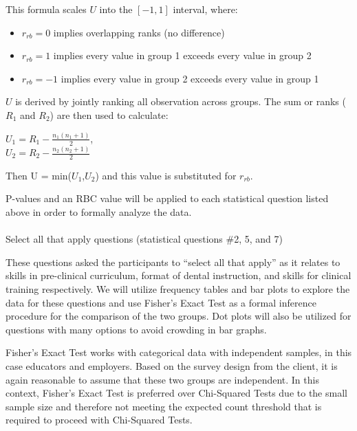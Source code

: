 \documentclass[
  12pt,
  letterpaper,
  DIV=11,
  numbers=noendperiod]{scrartcl}
\makeatletter
\let\oldparagraph\paragraph
\renewcommand{\paragraph}{
    \@ifstar
      \xxxParagraphStar
      \xxxParagraphNoStar
  }
\newcommand{\xxxParagraphStar}[1]{\oldparagraph*{#1}\mbox{}}
\newcommand{\xxxParagraphNoStar}[1]{\oldparagraph{#1}\mbox{}}
\providecommand{\tightlist}{%
  \setlength{\itemsep}{0pt}\setlength{\parskip}{0pt}}\usepackage{longtable,booktabs,array}
\numberwithin{figure}{section}
\numberwithin{table}{section}
\makeatother
\begin{document}
This formula scales \(U\) into the \([-1,1]\) interval, where:

\begin{itemize}
\tightlist
\item
  \(r_{rb} = 0\) implies overlapping ranks (no difference)\\
\item
  \(r_{rb} = 1\) implies every value in group 1 exceeds every value in
  group 2\\
\item
  \(r_{rb} = -1\) implies every value in group 2 exceeds every value in
  group 1
\end{itemize}

\(U\) is derived by jointly ranking all observation across groups. The
sum or ranks (\(R_1\) and \(R_2\)) are then used to calculate:

\(U_1 = R_1 - \frac{n_1(n_1+1)}{2}\),\\
\(U_2 = R_2 - \frac{n_2(n_2+1)}{2}\)

Then U = min(\(U_1\),\(U_2\)) and this value is substituted for
\(r_{rb}\).

P-values and an RBC value will be applied to each statistical question
listed above in order to formally analyze the data.

\paragraph{Select all that apply questions (statistical questions \#2,
5, and
7)}\label{select-all-that-apply-questions-statistical-questions-2-5-and-7}

These questions asked the participants to ``select all that apply'' as
it relates to skills in pre-clinical curriculum, format of dental
instruction, and skills for clinical training respectively. We will
utilize frequency tables and bar plots to explore the data for these
questions and use Fisher's Exact Test as a formal inference procedure
for the comparison of the two groups. Dot plots will also be utilized
for questions with many options to avoid crowding in bar graphs.

Fisher's Exact Test works with categorical data with independent
samples, in this case educators and employers. Based on the survey
design from the client, it is again reasonable to assume that these two
groups are independent. In this context, Fisher's Exact Test is
preferred over Chi-Squared Tests due to the small sample size and
therefore not meeting the expected count threshold that is required to
proceed with Chi-Squared Tests.
\end{document}
